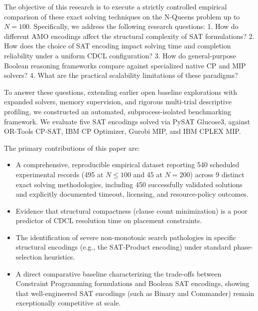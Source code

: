 The objective of this research is to execute a strictly controlled empirical comparison of these exact solving techniques on the N-Queens problem up to $N=100$. Specifically, we address the following research questions:
1. How do different AMO encodings affect the structural complexity of SAT formulations?
2. How does the choice of SAT encoding impact solving time and completion reliability under a uniform CDCL configuration?
3. How do general-purpose Boolean reasoning frameworks compare against specialized native CP and MIP solvers?
4. What are the practical scalability limitations of these paradigms?

To answer these questions, extending earlier open baseline explorations \citep{duongsuny2024nqueens} with expanded solvers, memory supervision, and rigorous multi-trial descriptive profiling, we constructed an automated, subprocess-isolated benchmarking framework. We evaluate five SAT encodings solved via PySAT Glucose3, against OR-Tools CP-SAT, IBM CP Optimizer, Gurobi MIP, and IBM CPLEX MIP. 

The primary contributions of this paper are:
\begin{itemize}
\item A comprehensive, reproducible empirical dataset reporting 540 scheduled experimental records (495 at $N \le 100$ and 45 at $N=200$) across 9 distinct exact solving methodologies, including 450 successfully validated solutions and explicitly documented timeout, licensing, and resource-policy outcomes.
\item Evidence that structural compactness (clause count minimization) is a poor predictor of CDCL resolution time on placement constraints.
\item The identification of severe non-monotonic search pathologies in specific structural encodings (e.g., the SAT-Product encoding) under standard phase-selection heuristics.
\item A direct comparative baseline characterizing the trade-offs between Constraint Programming formulations and Boolean SAT encodings, showing that well-engineered SAT encodings (such as Binary and Commander) remain exceptionally competitive at scale.
\end{itemize}
